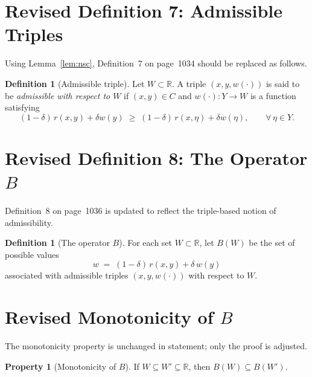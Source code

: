 \documentclass[12pt]{article}
\theoremstyle{definition}
\newtheorem{definition}[theorem]{Definition}
\newtheorem{property}[theorem]{Property}
\begin{document}
\section{Revised Definition 7: Admissible Triples}
\label{sec:def7}

Using Lemma~\ref{lem:nsc}, Definition~7 on page~1034 should be replaced as
follows.

\begin{definition}[Admissible triple]
\label{def:admissible}
Let $W \subset \mathbb{R}$.  A triple $(x, y, w(\cdot))$ is said to be
\emph{admissible with respect to $W$} if $(x, y) \in C$ and
$w(\cdot) : Y \to W$ is a function satisfying
\[
(1-\delta)\,r(x,y) + \delta w(y)
\;\geq\;
(1-\delta)\,r(x,\eta) + \delta w(\eta),
\qquad \forall\, \eta \in Y.
\]
\end{definition}

\section{Revised Definition 8: The Operator $B$}
\label{sec:def8}

Definition~8 on page~1036 is updated to reflect the triple-based notion of
admissibility.

\begin{definition}[The operator $B$]
\label{def:B}
For each set $W \subset \mathbb{R}$, let $B(W)$ be the set of possible values
\[
w \;=\; (1-\delta)\,r(x,y) + \delta\,w(y)
\]
associated with admissible triples $(x, y, w(\cdot))$ with respect to $W$.
\end{definition}

\section{Revised Monotonicity of $B$}
\label{sec:mono}

The monotonicity property is unchanged in statement; only the proof is
adjusted.

\begin{property}[Monotonicity of $B$]
If $W \subseteq W' \subseteq \mathbb{R}$, then $B(W) \subseteq B(W')$.
\end{property}
\end{document}
